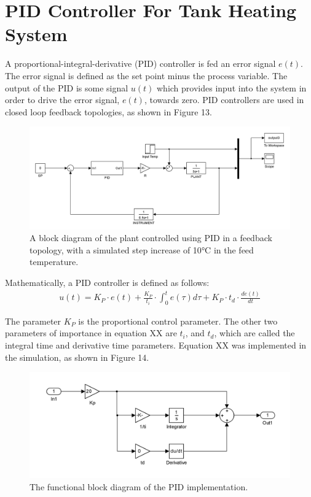 \documentclass{article}
\begin{document}
\section{PID Controller For Tank Heating System}
A proportional-integral-derivative (PID) controller is fed an error signal $e(t)$. The error signal is defined as the set point minus the process variable. The output of the PID is some signal $u(t)$ which provides input into the system in order to drive the error signal, $e(t)$, towards zero. PID controllers are used in closed loop feedback topologies, as shown in Figure 13.
\begin{figure}[h]
\centering
\includegraphics[scale=0.15]{block_45}
\caption{A block diagram of the plant controlled using PID in a feedback topology, with a simulated step increase of 10$\si{\degreeCelsius}$ in the feed temperature.}
\end{figure}

Mathematically, a PID controller is defined as follows:
\begin{align}
u(t) = K_P \cdot e(t) + \frac{K_P}{t_i} \cdot \int_{0}^{t} e(\tau) d\tau + K_P \cdot t_d \cdot \frac{de(t)}{dt}
\end{align}

The parameter $K_P$ is the proportional control parameter. The other two parameters of importance in equation XX are $t_i$, and $t_d$, which are called the integral time and derivative time parameters. Equation XX was implemented in the simulation, as shown in Figure 14.
\begin{figure}[h]
\centering
\includegraphics[scale=0.15]{block_3_pid}
\caption{The functional block diagram of the PID implementation.}
\end{figure}
\end{document}

